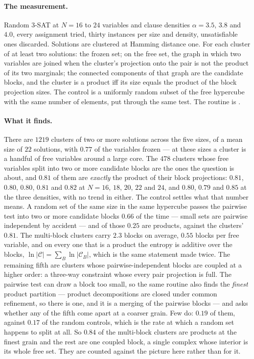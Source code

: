 \paragraph{The measurement.} Random $3$-SAT at $N=16$ to $24$ variables and
clause densities $\alpha=3.5$, $3.8$ and $4.0$, every assignment tried,
thirty instances per size and density, unsatisfiable ones discarded.
Solutions are clustered at Hamming distance one. For each cluster of at least
two solutions: the frozen set; on the free set, the graph in which two
variables are joined when the cluster's projection onto the pair is not the
product of its two marginals; the connected components of that graph are the
candidate blocks, and the cluster is a product iff its size equals the product
of the block projection sizes. The control is a uniformly random subset of
the free hypercube with the same number of elements, put through the same
test. The routine is .

\paragraph{What it finds.} There are $1219$ clusters of two or more
solutions across the five sizes, of a mean size of $22$ solutions, with
$0.77$ of the variables frozen --- at these sizes a cluster is a handful of
free variables around a large core. The $478$ clusters whose free variables
split into two or more candidate blocks are the ones the question is about,
and $0.81$ of them are \emph{exactly} the product of their block projections:
$0.81$, $0.80$, $0.80$, $0.81$ and $0.82$ at $N=16$, $18$, $20$, $22$
and $24$, and $0.80$, $0.79$ and $0.85$ at the three densities, with no
trend in either. The control settles what that number means. A random set of
the same size in the same hypercube passes the pairwise test into two or more
candidate blocks $0.66$ of the time --- small sets are pairwise independent by
accident --- and of those $0.25$ are products, against the clusters' $0.81$.
The multi-block clusters carry $2.3$ blocks on average, $0.55$ blocks per
free variable, and on every one that is a product the entropy is additive
over the blocks, $\ln|\mathcal{C}|=\sum_{B}\ln|\mathcal{C}_{B}|$, which is
the same statement made twice. The remaining fifth are clusters whose
pairwise-independent blocks are coupled at a higher order: a three-way
constraint whose every pair projection is full. The pairwise test can draw
a block too small, so the same routine also finds the \emph{finest} product
partition --- product decompositions are closed under common refinement, so
there is one, and it is a merging of the pairwise blocks --- and asks
whether any of the fifth come apart at a coarser grain. Few do: $0.19$ of
them, against $0.17$ of the random controls, which is the rate at which a
random set happens to split at all. So $0.84$ of the multi-block clusters
are products at the finest grain and the rest are one coupled block, a
single complex whose interior is its whole free set. They are counted
against the picture here rather than for it.

